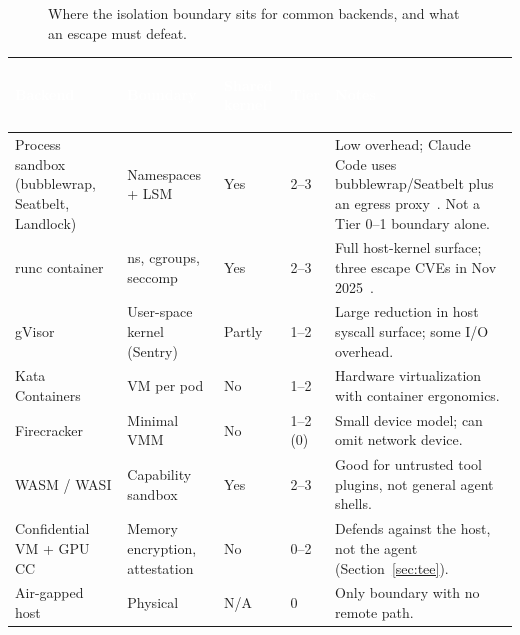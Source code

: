 \documentclass[11pt,letterpaper]{article}
\newcommand{\hrow}{\rowcolor{slategraphite}}
\newcommand{\hdr}[1]{\textcolor{white}{\bfseries\strut #1}}
\begin{document}
\begin{figure}[htbp]
\caption{Where the isolation boundary sits for common backends, and what an escape must defeat.}
\label{fig:boundaries}
\end{figure}

\begin{longtable}{L{2.9cm} L{2.6cm} L{1.5cm} L{1.5cm} L{6.3cm}}
\hrow \hdr{Backend} & \hdr{Boundary} & \hdr{Shared kernel} & \hdr{Tier} & \hdr{Notes} \\
\endhead
Process sandbox (bubblewrap, Seatbelt, Landlock) & Namespaces + LSM & Yes & 2--3 & Low overhead; Claude Code uses bubblewrap/Seatbelt plus an egress proxy~\cite{ccsandbox}. Not a Tier 0--1 boundary alone. \\
runc container & ns, cgroups, seccomp & Yes & 2--3 & Full host-kernel surface; three escape CVEs in Nov 2025~\cite{runc}. \\
gVisor & User-space kernel (Sentry) & Partly & 1--2 & Large reduction in host syscall surface; some I/O overhead. \\
Kata Containers & VM per pod & No & 1--2 & Hardware virtualization with container ergonomics. \\
Firecracker & Minimal VMM & No & 1--2 (0) & Small device model; can omit network device. \\
WASM / WASI & Capability sandbox & Yes & 2--3 & Good for untrusted tool plugins, not general agent shells. \\
Confidential VM + GPU CC & Memory encryption, attestation & No & 0--2 & Defends against the host, not the agent (Section~\ref{sec:tee}). \\
Air-gapped host & Physical & N/A & 0 & Only boundary with no remote path. \\*
\bottomrule
\end{longtable}
\end{document}
